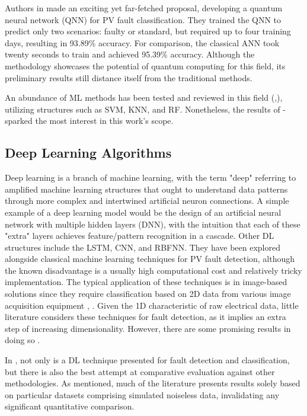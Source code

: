 Authors in \cite{Uehara2021} made an exciting yet far-fetched proposal, developing a quantum neural network (QNN) for PV fault classification. They trained the QNN to predict only two scenarios: faulty or standard, but required up to four training days, resulting in 93.89\% accuracy. For comparison, the classical ANN took twenty seconds to train and achieved 95.39\% accuracy. Although the methodology showcases the potential of quantum computing for this field, its preliminary results still distance itself from the traditional methods.

An abundance of ML methods has been tested and reviewed in this field (\cite{Hong2022},\cite{Livera2019}), utilizing structures such as SVM, KNN, and RF. Nonetheless, the results of \cite{Rao2021}-\cite{Kilic2020} sparked the most interest in this work's scope.

\subsection{Deep Learning Algorithms}

Deep learning is a branch of machine learning, with the term "deep" referring to amplified machine learning structures that ought to understand data patterns through more complex and intertwined artificial neuron connections. A simple example of a deep learning model would be the design of an artificial neural network with multiple hidden layers (DNN), with the intuition that each of these "extra" layers achieves feature/pattern recognition in a cascade. Other DL structures include the LSTM, CNN, and RBFNN. They have been explored alongside classical machine learning techniques for PV fault detection, although the known disadvantage is a usually high computational cost and relatively tricky implementation. The typical application of these techniques is in image-based solutions \cite{termoreview} since they require classification based on 2D data from various image acquisition equipment \cite{termo}, \cite{dlpv}. Given the 1D characteristic of raw electrical data, little literature considers these techniques for fault detection, as it implies an extra step of increasing dimensionality. However, there are some promising results in doing so \cite{Aziz2020}.

In \cite{Aziz2020}, not only is a DL technique presented for fault detection and classification, but there is also the best attempt at comparative evaluation against other methodologies. As mentioned, much of the literature presents results solely based on particular datasets comprising simulated noiseless data, invalidating any significant quantitative comparison.

